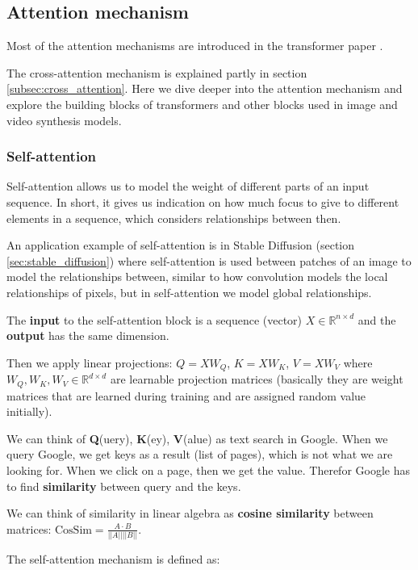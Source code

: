 \subsection{Attention mechanism}
\label{appendix:attention}

Most of the attention mechanisms are introduced in the transformer paper \cite{transformer}.

The cross-attention mechanism is explained partly in section \ref{subsec:cross_attention}. Here we dive deeper into the attention mechanism and explore the building blocks of transformers and other blocks used in image and video synthesis models.


\subsubsection{Self-attention}

Self-attention allows us to model the weight of different parts of an input sequence. In short, it gives us indication on how much focus to give to different elements in a sequence, which considers relationships between then.

An application example of self-attention is in Stable Diffusion (section \ref{sec:stable_diffusion}) where self-attention is used between patches of an image to model the relationships between, similar to how convolution models the local relationships of pixels, but in self-attention we model global relationships.

The \textbf{input} to the self-attention block is a sequence (vector) $X \in \mathbb{R}^{n \times d}$ and the \textbf{output} has the same dimension.

Then we apply linear projections: $Q = XW_Q$, $K = XW_K$, $V = XW_V$ where $W_Q, W_K, W_V \in \mathbb{R}^{d \times d}$ are learnable projection matrices (basically they are weight matrices that are learned during training and are assigned random value initially).

We can think of \textbf{Q}(uery), \textbf{K}(ey), \textbf{V}(alue) as text search in Google. When we query Google, we get keys as a result (list of pages), which is not what we are looking for. When we click on a page, then we get the value. Therefor Google has to find \textbf{similarity} between query and the keys.

We can think of similarity in linear algebra as \textbf{cosine similarity} between matrices: $\text{CosSim} = \frac{A \cdot B}{||A|| ||B||}$.

The self-attention mechanism is defined as:

